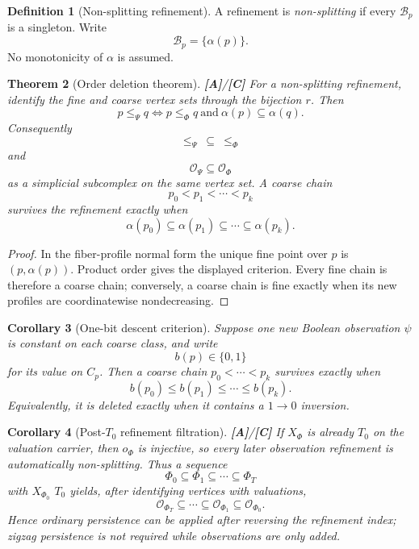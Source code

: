 \documentclass[11pt]{article}
\newtheorem{theorem}{Theorem}[section]
\newtheorem{corollary}[theorem]{Corollary}
\theoremstyle{definition}
\newtheorem{definition}[theorem]{Definition}
\newcommand{\OX}{\mathcal O}
\newcommand{\statusA}{\textbf{[A]}}
\newcommand{\statusC}{\textbf{[C]}}
\begin{document}
\begin{definition}[Non-splitting refinement]
A refinement is \emph{non-splitting} if every \(\mathcal B_p\) is a singleton. Write
\[
\mathcal B_p=\{\alpha(p)\}.
\]
No monotonicity of \(\alpha\) is assumed.
\end{definition}

\begin{theorem}[Order deletion theorem]\label{thm:orderdelete}
\statusA/\statusC\;
For a non-splitting refinement, identify the fine and coarse vertex sets through the bijection \(r\). Then
\[
p\le_\Psi q
\iff
p\le_\Phi q\ \text{and}\ \alpha(p)\subseteq\alpha(q).
\]
Consequently
\[
\le_\Psi\ \subseteq\ \le_\Phi
\]
and
\[
\OX_\Psi\subseteq\OX_\Phi
\]
as a simplicial subcomplex on the same vertex set. A coarse chain
\[
p_0<p_1<\cdots<p_k
\]
survives the refinement exactly when
\[
\alpha(p_0)\subseteq\alpha(p_1)\subseteq\cdots\subseteq\alpha(p_k).
\]
\end{theorem}

\begin{proof}
In the fiber-profile normal form the unique fine point over \(p\) is \((p,\alpha(p))\). Product order gives the displayed criterion. Every fine chain is therefore a coarse chain; conversely, a coarse chain is fine exactly when its new profiles are coordinatewise nondecreasing.
\end{proof}

\begin{corollary}[One-bit descent criterion]\label{cor:descent}
Suppose one new Boolean observation \(\psi\) is constant on each coarse class, and write
\[
b(p)\in\{0,1\}
\]
for its value on \(C_p\). Then a coarse chain \(p_0<\cdots<p_k\) survives exactly when
\[
b(p_0)\le b(p_1)\le\cdots\le b(p_k).
\]
Equivalently, it is deleted exactly when it contains a \(1\to0\) inversion.
\end{corollary}

\begin{corollary}[Post-\(T_0\) refinement filtration]\label{cor:T0filtration}
\statusA/\statusC\;
If \(X_\Phi\) is already \(T_0\) on the valuation carrier, then \(o_\Phi\) is injective, so every later observation refinement is automatically non-splitting. Thus a sequence
\[
\Phi_0\subseteq\Phi_1\subseteq\cdots\subseteq\Phi_T
\]
with \(X_{\Phi_0}\) \(T_0\) yields, after identifying vertices with valuations,
\[
\OX_{\Phi_T}\subseteq\cdots\subseteq\OX_{\Phi_1}\subseteq\OX_{\Phi_0}.
\]
Hence ordinary persistence can be applied after reversing the refinement index; zigzag persistence is not required while observations are only added.
\end{corollary}
\end{document}
